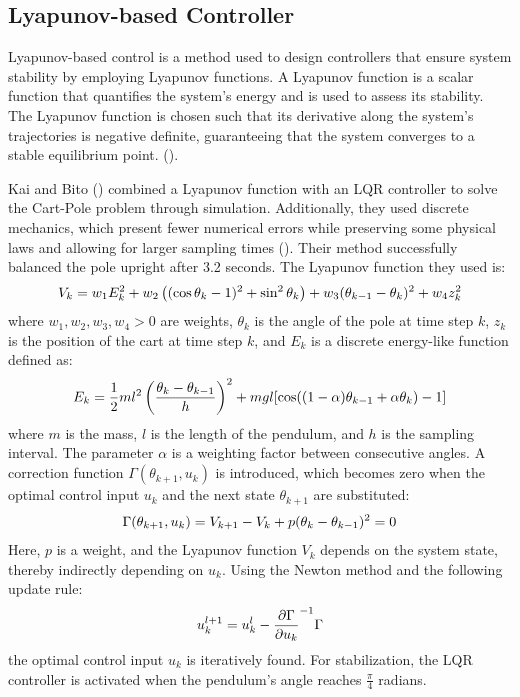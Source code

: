 \subsection{Lyapunov-based Controller}

Lyapunov-based control is a method used to design controllers that ensure system stability by employing Lyapunov functions. A Lyapunov function is a scalar function that quantifies the system's energy and is used to assess its stability. The Lyapunov function is chosen such that its derivative along the system's trajectories is negative definite, guaranteeing that the system converges to a stable equilibrium point. (\cite{slotine_applied_1991}).

Kai and Bito (\citeyear{kai_new_2014}) combined a Lyapunov function with an LQR controller to solve the Cart-Pole problem through simulation. Additionally, they used discrete mechanics, which present fewer numerical errors while preserving some physical laws and allowing for larger sampling times (\cite{marsden_discrete_2001}). Their method successfully balanced the pole upright after 3.2 seconds. The Lyapunov function they used is:
\begin{align}
    V_k = w_1E_k^2 + w_2\left((\cos\theta_k-1)^2 + \sin^2\theta_k\right) + w_3(\theta_{k-1} - \theta_k)^2 + w_4z_k^2 \notag
\end{align}
where $w_1, w_2, w_3, w_4 > 0$ are weights, $\theta_k$ is the angle of the pole at time step $k$, $z_k$ is the position of the cart at time step $k$, and $E_k$ is a discrete energy-like function defined as:
\begin{align}
    E_k = \frac{1}{2}ml^2\left(\frac{\theta_k - \theta_{k-1}}{h}\right)^2 + mgl[\cos((1-\alpha)\theta_{k-1} + \alpha\theta_k) - 1] \notag
\end{align}
where $m$ is the mass, $l$ is the length of the pendulum, and $h$ is the sampling interval. The parameter $\alpha$ is a weighting factor between consecutive angles. A correction function $\Gamma(\theta_{k+1}, u_k)$ is introduced, which becomes zero when the optimal control input $u_k$ and the next state $\theta_{k+1}$ are substituted:
\begin{align}
    \Gamma(\theta_{k+1}, u_k) = V_{k+1} - V_k + p(\theta_k - \theta_{k-1})^2 = 0 \notag
\end{align}
Here, $p$ is a weight, and the Lyapunov function $V_k$ depends on the system state, thereby indirectly depending on $u_k$. Using the Newton method and the following update rule:
\begin{align}
    u_{k}^{l+1} = u_k^l - \frac{\partial\Gamma}{\partial u_k}^{-1}\Gamma \notag
\end{align}
the optimal control input $u_k$ is iteratively found. For stabilization, the LQR controller is activated when the pendulum's angle reaches $\frac{\pi}{4}$ radians.

